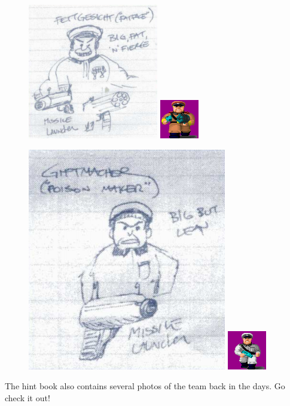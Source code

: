 \documentclass[book.tex]{subfiles}
\begin{document}
   \begin{figure}[H]
\centering
 \includegraphics[scale=1]{imgs/tom_hall_sketch_officer.png}
\includegraphics[scale=9]{imgs/sprites/fettgesic.png}
 \end{figure}
 
   \begin{figure}[H]
\centering
 \includegraphics[scale=0.5]{imgs/tom_hall_sketch_officer2.png}
 \includegraphics[scale=8]{imgs/sprites/giftmacher.png}

 \end{figure}
 
 
The hint book also contains several photos of the team back in the days. Go check it out!
\end{document}
